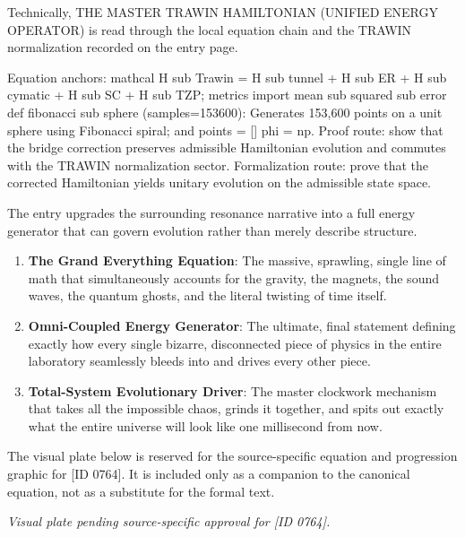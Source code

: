Technically, THE MASTER TRAWIN HAMILTONIAN (UNIFIED ENERGY OPERATOR) is read through the local equation chain and the TRAWIN normalization recorded on the entry page.

Equation anchors: mathcal H sub Trawin = H sub tunnel + H sub ER + H sub cymatic + H sub SC + H sub TZP; metrics import mean sub squared sub error def fibonacci sub sphere (samples=153600): Generates 153,600 points on a unit sphere using Fibonacci spiral; and points = [] phi = np. Proof route: show that the bridge correction preserves admissible Hamiltonian evolution and commutes with the TRAWIN normalization sector. Formalization route: prove that the corrected Hamiltonian yields unitary evolution on the admissible state space.

The entry upgrades the surrounding resonance narrative into a full energy generator that can govern evolution rather than merely describe structure.
\endgroup

\begin{enumerate}[leftmargin=1.6em,itemsep=6pt,topsep=4pt]
\item \textbf{The Grand Everything Equation}: The massive, sprawling, single line of math that simultaneously accounts for the gravity, the magnets, the sound waves, the quantum ghosts, and the literal twisting of time itself.
\item \textbf{Omni-Coupled Energy Generator}: The ultimate, final statement defining exactly how every single bizarre, disconnected piece of physics in the entire laboratory seamlessly bleeds into and drives every other piece.
\item \textbf{Total-System Evolutionary Driver}: The master clockwork mechanism that takes all the impossible chaos, grinds it together, and spits out exactly what the entire universe will look like one millisecond from now.
\end{enumerate}

\begingroup\footnotesize\sloppy
The visual plate below is reserved for the source-specific equation and progression graphic for [ID 0764]. It is included only as a companion to the canonical equation, not as a substitute for the formal text.
\par\endgroup
\begingroup\footnotesize\itshape
Visual plate pending source-specific approval for [ID 0764].
\par\endgroup

